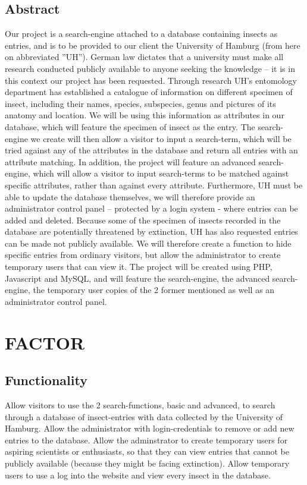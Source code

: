 \documentclass[12pt,a4paper]{article}
\begin{document}
\subsection{Abstract}
Our project is a search-engine attached to a database containing insects as entries, and is to be provided to our client the University of Hamburg (from here on abbreviated ”UH”).
German law dictates that a university must make all research conducted publicly available to anyone seeking the knowledge – it is in this context our project has been requested.
Through research UH's entomology department has established a catalogue of information on different specimen of insect, including their names, species, subspecies, genus and pictures of its anatomy and location.
We will be using this information as attributes in our database, which will feature the specimen of insect as the entry.
The search-engine we create will then allow a visitor to input a search-term, which will be tried against any of the attributes in the database and return all entries with an attribute matching.
In addition, the project will feature an advanced search-engine, which will allow a visitor to input search-terms to be matched against specific attributes, rather than against every attribute.
Furthermore, UH must be able to update the database themselves, we will therefore provide an administrator control panel – protected by a login system - where entries can be added and deleted.
Because some of the specimen of insects recorded in the database are potentially threatened by extinction, UH has also requested entries can be made not publicly available.
We will therefore create a function to hide specific entries from ordinary visitors, but allow the administrator to create temporary users that can view it.
The project will be created using PHP, Javascript and MySQL, and will feature the search-engine, the advanced search-engine, the temporary user copies of the 2 former mentioned as well as an administrator control panel.
\newpage

\section{FACTOR}
\subsection{Functionality}
Allow visitors to use the 2 search-functions, basic and advanced, to search through a database
of insect-entries with data collected by the University of Hamburg. 
Allow the administrator with login-credentials to remove or add new entries to the database.
Allow the adminstrator to create temporary users for aspiring scientists or enthusiasts, so that they can view entries that cannot be publicly available (because they might be facing extinction).
Allow temporary users to use a log into the website and view every insect in the database. 
\end{document}

